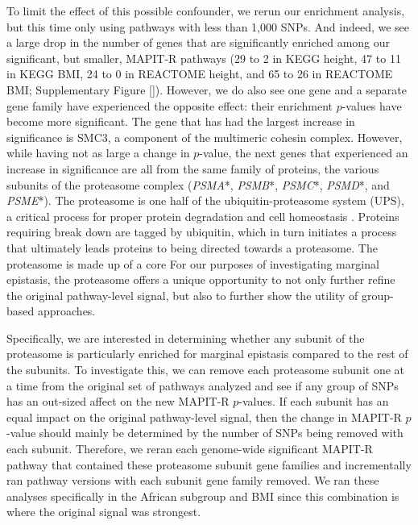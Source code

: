 \documentclass[12pt,a4paper]{article}
\begin{document}
To limit the effect of this possible confounder, we rerun our enrichment analysis, but this time only using pathways with less than 1,000 SNPs. And indeed, we see a large drop in the number of genes that are significantly enriched among our significant, but smaller, MAPIT-R pathways (29 to 2 in KEGG height, 47 to 11 in KEGG BMI, 24 to 0 in REACTOME height, and 65 to 26 in REACTOME BMI; Supplementary Figure \ref{}). However, we do also see one gene and a separate gene family  have experienced the opposite effect: their enrichment $p$-values have become more significant. The gene that has had the largest increase in significance is SMC3, a component of the multimeric cohesin complex. However, while having not as large a change in $p$-value, the next genes that experienced an increase in significance are all from the same family of proteins, the various subunits of the proteasome complex (\textit{PSMA}*, \textit{PSMB}*, \textit{PSMC}*, \textit{PSMD}*, and \textit{PSME}*). The proteasome is one half of the ubiquitin-proteasome system (UPS), a critical process for proper protein degradation and cell homeostasis \citep{Voges1999,Livneh2016,Collins2017}. Proteins requiring break down are tagged by ubiquitin, which in turn initiates a process that ultimately leads proteins to being directed towards a proteasome. The proteasome is made up of a core For our purposes of investigating marginal epistasis, the proteasome offers a unique opportunity to not only further refine the original pathway-level signal, but also to further show the utility of group-based approaches.

Specifically, we are interested in determining whether any subunit of the proteasome is particularly enriched for marginal epistasis compared to the rest of the subunits. To investigate this, we can remove each proteasome subunit one at a time from the original set of pathways analyzed and see if any group of SNPs has an out-sized affect on the new MAPIT-R $p$-values. If each subunit has an equal impact on the original pathway-level signal, then the change in MAPIT-R $p$-value should mainly be determined by the number of SNPs being removed with each subunit. Therefore, we reran each genome-wide significant MAPIT-R pathway that contained these proteasome subunit gene families and incrementally ran pathway versions with each subunit gene family removed. We ran these analyses specifically in the African subgroup and BMI since this combination is where the original signal was strongest. 
\end{document}
